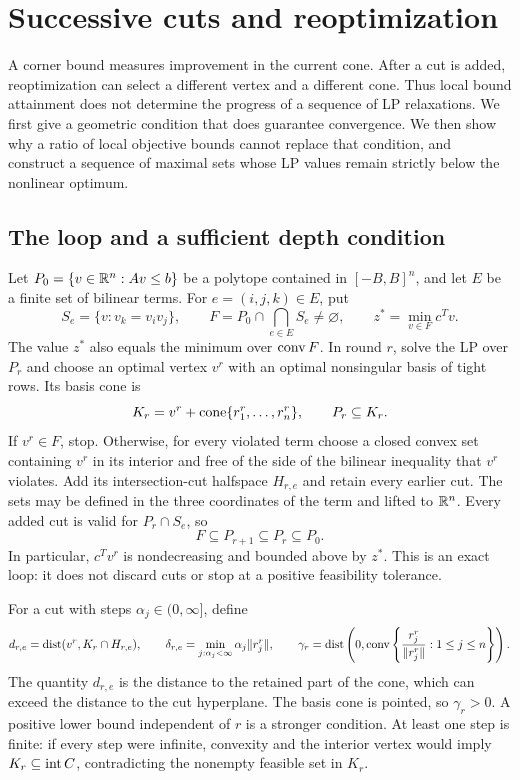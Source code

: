 \section{Successive cuts and reoptimization}\label{cv:section}

A corner bound measures improvement in the current cone. After a cut is
added, reoptimization can select a different vertex and a different cone.
Thus local bound attainment does not determine the progress of a sequence of
LP relaxations. We first give a geometric condition that does guarantee
convergence. We then show why a ratio of local objective bounds cannot
replace that condition, and construct a sequence of maximal sets whose LP
values remain strictly below the nonlinear optimum.

\subsection{The loop and a sufficient depth condition}

Let $P_0=\{v\in\mathbb R^n:Av\le b\}$ be a polytope contained in
$[-B,B]^n$, and let $E$ be a finite set of bilinear terms. For
$e=(i,j,k)\in E$, put
\[
 S_e=\{v:v_k=v_iv_j\},\qquad
 F=P_0\cap\bigcap_{e\in E}S_e\ne\varnothing,
 \qquad z^*=\min_{v\in F}c^Tv.
\]
The value $z^*$ also equals the minimum over $\operatorname{conv} F$. In round $r$, solve
the LP over $P_r$ and choose an optimal vertex $v^r$ with an optimal
nonsingular basis of tight rows. Its basis cone is
\[
 K_r=v^r+\operatorname{cone}\{r_1^r,\ldots,r_n^r\},\qquad P_r\subseteq K_r.
\]
If $v^r\in F$, stop. Otherwise, for every violated term choose a closed
convex set containing $v^r$ in its interior and free of the side of the
bilinear inequality that $v^r$ violates. Add its intersection-cut halfspace
$H_{r,e}$ and retain every earlier cut. The sets may be defined in the
three coordinates of the term and lifted to $\mathbb R^n$. Every added cut is
valid for $P_r\cap S_e$, so
\[
 F\subseteq P_{r+1}\subseteq P_r\subseteq P_0.
\]
In particular, $c^Tv^r$ is nondecreasing and bounded above by $z^*$.
This is an exact loop: it does not discard cuts or stop at a positive
feasibility tolerance.

For a cut with steps $\alpha_j\in(0,\infty]$, define
\begin{equation}\label{cv:depth-definitions}
 d_{r,e}=\operatorname{dist}(v^r,K_r\cap H_{r,e}),\qquad
 \delta_{r,e}=\min_{j:\alpha_j<\infty}\alpha_j\lVert r_j^r\rVert,\qquad
 \gamma_r=\operatorname{dist}\left(0,\operatorname{conv}\left\{
                  \frac{r_j^r}{\lVert r_j^r\rVert}:1\le j\le n\right\}\right).
\end{equation}
The quantity $d_{r,e}$ is the distance to the retained part of the cone,
which can exceed the distance to the cut hyperplane. The basis cone is
pointed, so $\gamma_r>0$. A positive lower bound independent of $r$ is a
stronger condition. At least one step is finite: if every step were
infinite, convexity and the interior vertex would imply
$K_r\subseteq\operatorname{int} C$, contradicting the nonempty feasible set in $K_r$.

